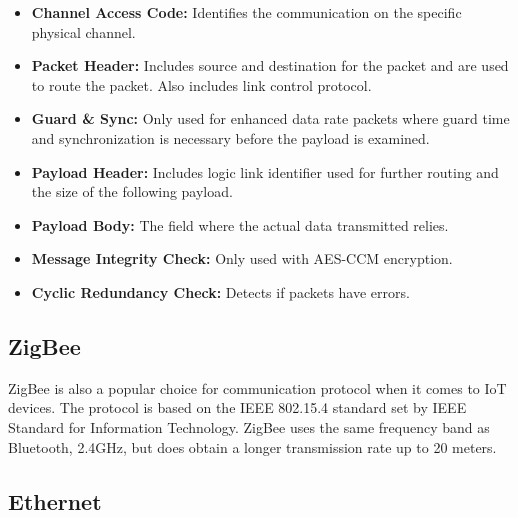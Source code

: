 \begin{itemize}
    \item \textbf{Channel Access Code:} Identifies the communication on the specific physical channel. 
    \item \textbf{Packet Header:} Includes source and destination for the packet and are used to route the packet. Also includes link control protocol. 
    \item \textbf{Guard & Sync:} Only used for enhanced data rate packets where guard time and synchronization is necessary before the payload is examined.
    \item \textbf{Payload Header:} Includes logic link identifier used for further routing and the size of the following payload.
    \item \textbf{Payload Body:} The field where the actual data transmitted relies. 
    \item \textbf{Message Integrity Check:} Only used with AES-CCM encryption.
    \item \textbf{Cyclic Redundancy Check:} Detects if packets have errors. 
\end{itemize}


\subsection*{ZigBee}
ZigBee is also a popular choice for communication protocol when it comes to IoT devices. The protocol is based on the IEEE 802.15.4 standard set by IEEE Standard for Information Technology. \cite{ZigBeeStandard} ZigBee uses the same frequency band as Bluetooth, 2.4GHz, but does obtain a longer transmission rate up to 20 meters. \cite{IAQMonitorCommunicationReview} 

\subsection*{Ethernet}

